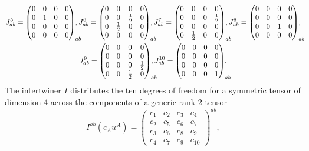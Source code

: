 \begin{equation}
\begin{gathered}
    J_{ab}^5 = \begin{pmatrix}0 & 0 & 0 & 0 \\ 0 & 1 & 0 & 0 \\ 0 & 0 & 0 & 0 \\ 0 & 0 & 0 & 0\end{pmatrix}_{ab}\hspace{-1em}, J_{ab}^6 = \begin{pmatrix}0 & 0 & 0 & 0 \\ 0 & 0 & \frac{1}{2} & 0 \\ 0 & \frac{1}{2} & 0 & 0 \\ 0 & 0 & 0 & 0\end{pmatrix}_{ab}\hspace{-1em}, J_{ab}^7 = \begin{pmatrix}0 & 0 & 0 & 0 \\ 0 & 0 & 0 & \frac{1}{2} \\ 0 & 0 & 0 & 0 \\ 0 & \frac{1}{2} & 0 & 0\end{pmatrix}_{ab}\hspace{-1em}, J_{ab}^8 = \begin{pmatrix}0 & 0 & 0 & 0 \\ 0 & 0 & 0 & 0 \\ 0 & 0 & 1 & 0 \\ 0 & 0 & 0 & 0\end{pmatrix}_{ab}\hspace{-1em}, \\
    J_{ab}^9 = \begin{pmatrix}0 & 0 & 0 & 0 \\ 0 & 0 & 0 & 0 \\ 0 & 0 & 0 & \frac{1}{2} \\ 0 & 0 & \frac{1}{2} & 0\end{pmatrix}_{ab}\hspace{-1em}, J_{ab}^{10} = \begin{pmatrix}0 & 0 & 0 & 0 \\ 0 & 0 & 0 & 0 \\ 0 & 0 & 0 & 0 \\ 0 & 0 & 0 & 1\end{pmatrix}_{ab}\hspace{-1em}.
  \end{gathered}
\end{equation}
The intertwiner $I$ distributes the ten degrees of freedom for a symmetric tensor of dimension 4 across the components of a generic rank-2 tensor
\begin{equation}
  I^{ab}(c_Au^A) = \begin{pmatrix} c_1 & c_2 & c_3 & c_4 \\ c_2 & c_5 & c_6 & c_7 \\ c_3 & c_6 & c_8 & c_9 \\ c_4 & c_7 & c_9 & c_{10}\end{pmatrix}^{ab},
\end{equation}
